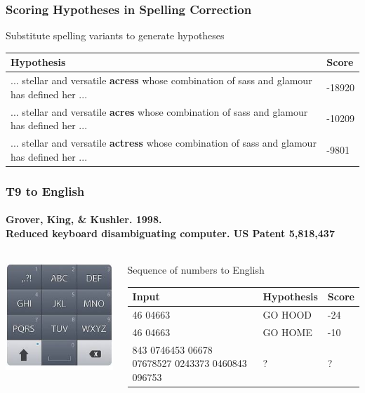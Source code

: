 \begin{frame}
\frametitle{Scoring Hypotheses in Spelling Correction}
\centering
\begin{block}{Substitute spelling variants to generate hypotheses}
\begin{tabular}{p{8cm}l}
\rowcolor{MidnightBlue!50}
Hypothesis & Score \\
\hline
... stellar and versatile {\color{MidnightBlue}\textbf{acress}} whose combination of sass and glamour has defined her ... & -18920 \\
... stellar and versatile {\color{MidnightBlue}\textbf{acres}} whose combination of sass and glamour has defined her ... & -10209 \\
... stellar and versatile {\color{MidnightBlue}\textbf{actress}} whose combination of sass and glamour has defined her ... & -9801
\end{tabular}
\end{block}
\end{frame}

\begin{frame}
\frametitle{T9 to English}
\framesubtitle{Grover, King, \& Kushler. 1998. \\Reduced keyboard disambiguating computer. US Patent 5,818,437}
\begin{columns}
\begin{column}{0.25\textwidth}
\centering
\includegraphics[scale=.4]{figures/android_t9.jpg}
\end{column}
\begin{column}{0.75\textwidth}  %
\begin{block}{Sequence of numbers to English}
\begin{tabular}{p{3cm}p{3cm}l}
\rowcolor{MidnightBlue!50}
Input & Hypothesis & Score \\
\hline
46 04663 & GO HOOD & -24 \\
46 04663 & GO HOME & -10 \\
843 0746453 06678 07678527 0243373 0460843 096753 & ? & ? \end{tabular} %
\end{block}
\end{column}
\end{columns}

\end{frame}

